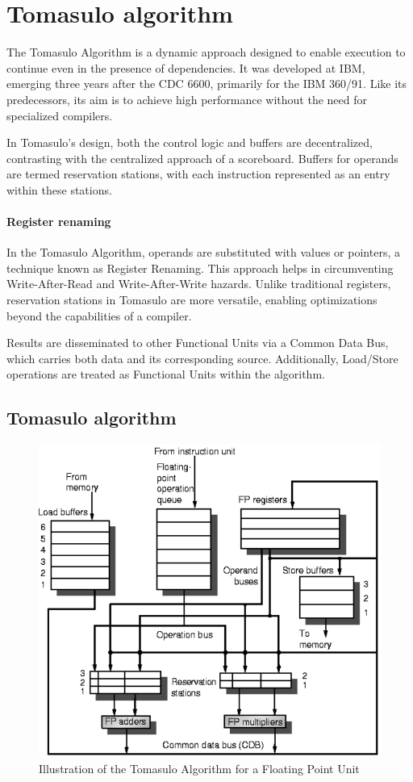 \section{Tomasulo algorithm}

The Tomasulo Algorithm is a dynamic approach designed to enable execution to continue even in the presence of dependencies. 
It was developed at IBM, emerging three years after the CDC 6600, primarily for the IBM 360/91. 
Like its predecessors, its aim is to achieve high performance without the need for specialized compilers.

In Tomasulo's design, both the control logic and buffers are decentralized, contrasting with the centralized approach of a scoreboard. 
Buffers for operands are termed reservation stations, with each instruction represented as an entry within these stations.

\paragraph*{Register renaming}
In the Tomasulo Algorithm, operands are substituted with values or pointers, a technique known as Register Renaming. 
This approach helps in circumventing Write-After-Read and Write-After-Write hazards. 
Unlike traditional registers, reservation stations in Tomasulo are more versatile, enabling optimizations beyond the capabilities of a compiler.

Results are disseminated to other Functional Units via a Common Data Bus, which carries both data and its corresponding source. 
Additionally, Load/Store operations are treated as Functional Units within the algorithm.

\subsection{Tomasulo algorithm}
\begin{figure}[H]
    \centering
    \includegraphics[width=0.5\linewidth]{images/tomasulo.png}
    \caption{Illustration of the Tomasulo Algorithm for a Floating Point Unit}
\end{figure}

